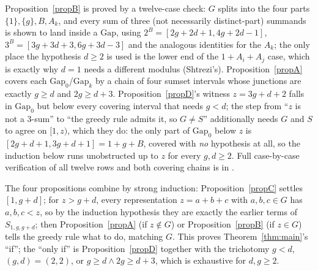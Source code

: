 \documentclass[10pt,reqno]{amsart}
\theoremstyle{plain}
\theoremstyle{definition}
\theoremstyle{remark}
\numberwithin{theorem}{section}
\newcommand{\G}{G}
\begin{document}
Proposition~\ref{propB} is proved by a twelve-case check: $\G$ splits into the four parts
$\{1\},\{g\},B,A_k$, and every sum of three (not necessarily distinct-part) summands is shown
to land inside a $\mathrm{Gap}$, using $2^B=[2g{+}2d{+}1,4g{+}2d{-}1]$,
$3^B=[3g{+}3d{+}3,6g{+}3d{-}3]$ and the analogous identities for the $A_k$; the only place the
hypothesis $d\ge2$ is used is the lower end of the $1+A_i+A_j$ case, which is exactly why
$d=1$ needs a different modulus (Shtrezi's). Proposition~\ref{propA} covers each
$\mathrm{Gap}_0$/$\mathrm{Gap}_k$ by a chain of four sumset intervals whose junctions are
exactly $g\ge d$ and $2g\ge d+3$. Proposition~\ref{propD}'s witness $z=3g+d+2$ falls in
$\mathrm{Gap}_0$ but below every covering interval that needs $g<d$; the step from ``$z$ is
not a 3-sum'' to ``the greedy rule admits it, so $\G\ne S$'' additionally needs $\G$ and $S$
to agree on $[1,z)$, which they do: the only part of $\mathrm{Gap}_0$ below $z$ is
$[2g{+}d{+}1,3g{+}d{+}1]=1+g+B$, covered with \emph{no} hypothesis at all, so the induction
below runs unobstructed up to $z$ for every $g,d\ge2$. Full case-by-case verification of all
twelve rows and both covering chains is in \cite[\S4]{Attack4}.

The four propositions combine by strong induction: Proposition~\ref{propC} settles $[1,g+d]$;
for $z>g+d$, every representation $z=a+b+c$ with $a,b,c\in\G$ has $a,b,c<z$, so by the
induction hypothesis they are exactly the earlier terms of $S_{1,g,g+d}$; then
Proposition~\ref{propA} (if $z\notin\G$) or Proposition~\ref{propB} (if $z\in\G$) tells the
greedy rule what to do, matching $\G$. This proves Theorem~\ref{thm:main}'s ``if''; the ``only
if'' is Proposition~\ref{propD} together with the trichotomy $g<d$, $(g,d)=(2,2)$, or
$g\ge d\wedge 2g\ge d+3$, which is exhaustive for $d,g\ge2$.
\end{document}
